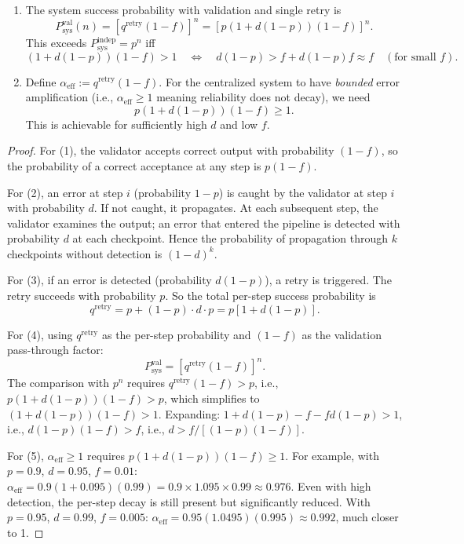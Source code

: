 \begin{theorem}
\begin{enumerate}
  \item The system success probability with validation and single retry is
  \[
    P_{\mathrm{sys}}^{\mathrm{val}}(n) = [q^{\mathrm{retry}}(1-f)]^n
    = [p(1+d(1-p))(1-f)]^n.
  \]
  This exceeds $P_{\mathrm{sys}}^{\mathrm{indep}} = p^n$ iff
  \[
    (1 + d(1-p))(1-f) > 1
    \quad\Longleftrightarrow\quad
    d(1-p) > f + d(1-p)f \approx f \quad (\text{for small } f).
  \]

  \item Define $\alpha_{\mathrm{eff}} := q^{\mathrm{retry}}(1-f)$. For the centralized
  system to have \emph{bounded} error amplification (i.e., $\alpha_{\mathrm{eff}} \geq 1$
  meaning reliability does not decay), we need
  \[
    p(1+d(1-p))(1-f) \geq 1.
  \]
  This is achievable for sufficiently high $d$ and low $f$.
\end{enumerate}
\end{theorem}

\begin{proof}
For (1), the validator accepts correct output with probability $(1-f)$, so
the probability of a correct acceptance at any step is $p(1-f)$.

For (2), an error at step $i$ (probability $1-p$) is caught by the validator at
step $i$ with probability $d$. If not caught, it propagates. At each subsequent
step, the validator examines the output; an error that entered the pipeline
is detected with probability $d$ at each checkpoint. Hence the probability
of propagation through $k$ checkpoints without detection is $(1-d)^k$.

For (3), if an error is detected (probability $d(1-p)$), a retry is triggered.
The retry succeeds with probability $p$. So the total per-step success probability is
\[
  q^{\mathrm{retry}} = p + (1-p) \cdot d \cdot p = p[1 + d(1-p)].
\]

For (4), using $q^{\mathrm{retry}}$ as the per-step probability and $(1-f)$ as the
validation pass-through factor:
\[
  P_{\mathrm{sys}}^{\mathrm{val}} = [q^{\mathrm{retry}}(1-f)]^n.
\]
The comparison with $p^n$ requires $q^{\mathrm{retry}}(1-f) > p$, i.e.,
$p(1+d(1-p))(1-f) > p$, which simplifies to $(1+d(1-p))(1-f) > 1$.
Expanding: $1 + d(1-p) - f - fd(1-p) > 1$, i.e., $d(1-p)(1-f) > f$,
i.e., $d > f/[(1-p)(1-f)]$.

For (5), $\alpha_{\mathrm{eff}} \geq 1$ requires $p(1+d(1-p))(1-f) \geq 1$.
For example, with $p = 0.9$, $d = 0.95$, $f = 0.01$:
$\alpha_{\mathrm{eff}} = 0.9(1 + 0.095)(0.99) = 0.9 \times 1.095 \times 0.99 \approx 0.976$.
Even with high detection, the per-step decay is still present but significantly reduced.
With $p = 0.95$, $d = 0.99$, $f = 0.005$:
$\alpha_{\mathrm{eff}} = 0.95(1.0495)(0.995) \approx 0.992$, much closer to 1.
\end{proof}

